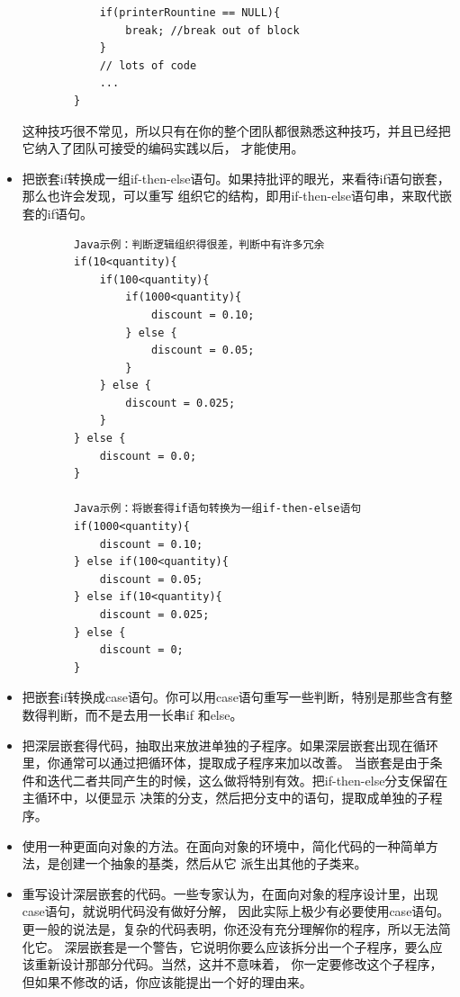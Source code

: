 \documentclass{article}
\begin{document}
\begin{itemize}
\begin{lstlisting}
            if(printerRountine == NULL){
                break; //break out of block
            }
            // lots of code
            ...
        }
    \end{lstlisting}
    这种技巧很不常见，所以只有在你的整个团队都很熟悉这种技巧，并且已经把它纳入了团队可接受的编码实践以后，
    才能使用。
    \item 把嵌套if转换成一组if-then-else语句。如果持批评的眼光，来看待if语句嵌套，那么也许会发现，可以重写
    组织它的结构，即用if-then-else语句串，来取代嵌套的if语句。
    \begin{lstlisting}
        Java示例：判断逻辑组织得很差，判断中有许多冗余
        if(10<quantity){
            if(100<quantity){
                if(1000<quantity){
                    discount = 0.10;
                } else {
                    discount = 0.05;
                }
            } else {
                discount = 0.025;
            }
        } else {
            discount = 0.0;
        }

        Java示例：将嵌套得if语句转换为一组if-then-else语句
        if(1000<quantity){
            discount = 0.10;
        } else if(100<quantity){
            discount = 0.05;
        } else if(10<quantity){
            discount = 0.025;
        } else {
            discount = 0;
        }
    \end{lstlisting}
    \item 把嵌套if转换成case语句。你可以用case语句重写一些判断，特别是那些含有整数得判断，而不是去用一长串if
    和else。
    \item 把深层嵌套得代码，抽取出来放进单独的子程序。如果深层嵌套出现在循环里，你通常可以通过把循环体，提取成子程序来加以改善。
    当嵌套是由于条件和迭代二者共同产生的时候，这么做将特别有效。把if-then-else分支保留在主循环中，以便显示
    决策的分支，然后把分支中的语句，提取成单独的子程序。
    \item 使用一种更面向对象的方法。在面向对象的环境中，简化代码的一种简单方法，是创建一个抽象的基类，然后从它
    派生出其他的子类来。
    \item 重写设计深层嵌套的代码。一些专家认为，在面向对象的程序设计里，出现case语句，就说明代码没有做好分解，
    因此实际上极少有必要使用case语句。更一般的说法是，复杂的代码表明，你还没有充分理解你的程序，所以无法简化它。
    深层嵌套是一个警告，它说明你要么应该拆分出一个子程序，要么应该重新设计那部分代码。当然，这并不意味着，
    你一定要修改这个子程序，但如果不修改的话，你应该能提出一个好的理由来。
\end{itemize}
\end{document}
